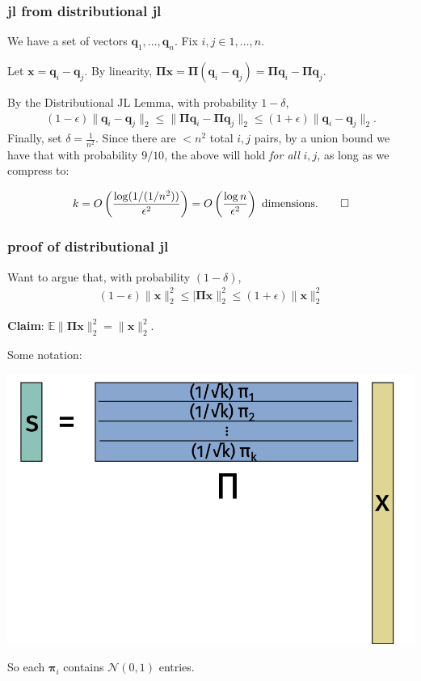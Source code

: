 \documentclass[compress,handout]{beamer}
\newcommand{\bs}[1]{\boldsymbol{#1}}
\newcommand{\bv}[1]{\mathbf{#1}}
\newcommand{\E}{\mathbb{E}}
\begin{document}
\begin{frame}
	\frametitle{jl from distributional jl}
	We have a set of vectors $\bv{q}_1, \ldots, \bv{q}_n$. Fix $i,j \in 1,\ldots, n$. 
	
	Let $\bv{x} = \bv{q}_i - \bv{q}_j$. By linearity, $\bs{\Pi}\bv{x} = \bs{\Pi}(\bv{q}_i - \bv{q}_j) = \bs{\Pi}\bv{q}_i - \bs{\Pi}\bv{q}_j$.
	
	By the Distributional JL Lemma, with probability $1-\delta$,
	\begin{align*}
		(1-\epsilon)\|\bv{q}_i - \bv{q}_j\|_2 \leq \|\bs{\Pi}\bv{q}_i - \bs{\Pi}\bv{q}_j\|_2 \leq (1+\epsilon) \|\bv{q}_i - \bv{q}_j\|_2.
	\end{align*}
	Finally, set $\delta = \frac{1}{n^2}$. Since there are $< n^2$ total $i,j$ pairs, by a union bound we have that with probability $9/10$, the above will hold \emph{for all} $i,j$, as long as we compress to:

	\begin{align*}
		k = O\left(\frac{\log(1/(1/n^2))}{\epsilon^2}\right) = O\left(\frac{\log n}{\epsilon^2}\right) \text{ dimensions.}\qed
	\end{align*}
	
\end{frame}

\begin{frame}
	\frametitle{proof of distributional jl}
	Want to argue that, with probability $(1-\delta)$,
	\begin{align*}
	(1-\epsilon)\|\bv{x}\|_2^2 \leq |\bs{\Pi}\bv{x}\|_2^2 \leq (1+\epsilon)\|\bv{x}\|_2^2 
	\end{align*}
	
	\begin{center}
	\alert{\textbf{Claim}: $\E \|\bs{\Pi} \bv{x} \|_2^2 = \|\bv{x}\|_2^2.$}
	\end{center}

\vspace{-1em}
Some notation:
\begin{center}
	\includegraphics[width=.6\textwidth]{jl_notation.png}
	
	So each $\bs{\pi}_i$ contains $\mathcal{N}(0,1)$ entries. 
\end{center}
\end{frame}
\end{document}
